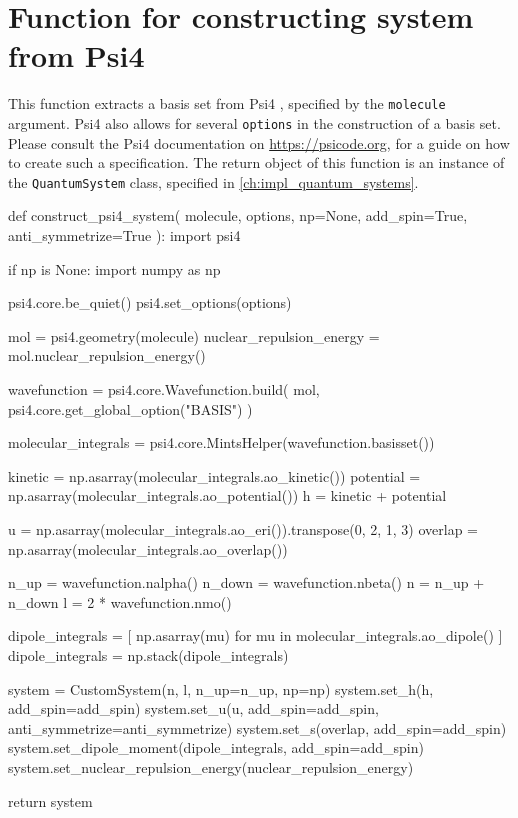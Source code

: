 \section{Function for constructing system from Psi4}
\label{sec:custom_system_psi4}

This function extracts a basis set from Psi4 \cite{parrish2017psi4}, specified 
by the \lstinline{molecule} argument. Psi4 also allows for several \lstinline{options}
in the construction of a basis set. Please consult the Psi4 documentation on 
\url{https://psicode.org}, for a guide on how to create such a specification.
The return object of this function is an instance of the
\lstinline{QuantumSystem} class, specified in
\autoref{ch:impl_quantum_systems}.

\begin{python}
def construct_psi4_system(
    molecule, options, np=None, add_spin=True, anti_symmetrize=True
):
    import psi4

    if np is None:
        import numpy as np

    psi4.core.be_quiet()
    psi4.set_options(options)

    mol = psi4.geometry(molecule)
    nuclear_repulsion_energy = mol.nuclear_repulsion_energy()

    wavefunction = psi4.core.Wavefunction.build(
        mol, psi4.core.get_global_option("BASIS")
    )

    molecular_integrals = psi4.core.MintsHelper(wavefunction.basisset())

    kinetic = np.asarray(molecular_integrals.ao_kinetic())
    potential = np.asarray(molecular_integrals.ao_potential())
    h = kinetic + potential

    u = np.asarray(molecular_integrals.ao_eri()).transpose(0, 2, 1, 3)
    overlap = np.asarray(molecular_integrals.ao_overlap())

    n_up = wavefunction.nalpha()
    n_down = wavefunction.nbeta()
    n = n_up + n_down
    l = 2 * wavefunction.nmo()

    dipole_integrals = [
        np.asarray(mu) for mu in molecular_integrals.ao_dipole()
    ]
    dipole_integrals = np.stack(dipole_integrals)

    system = CustomSystem(n, l, n_up=n_up, np=np)
    system.set_h(h, add_spin=add_spin)
    system.set_u(u, add_spin=add_spin, anti_symmetrize=anti_symmetrize)
    system.set_s(overlap, add_spin=add_spin)
    system.set_dipole_moment(dipole_integrals, add_spin=add_spin)
    system.set_nuclear_repulsion_energy(nuclear_repulsion_energy)

    return system
\end{python}


